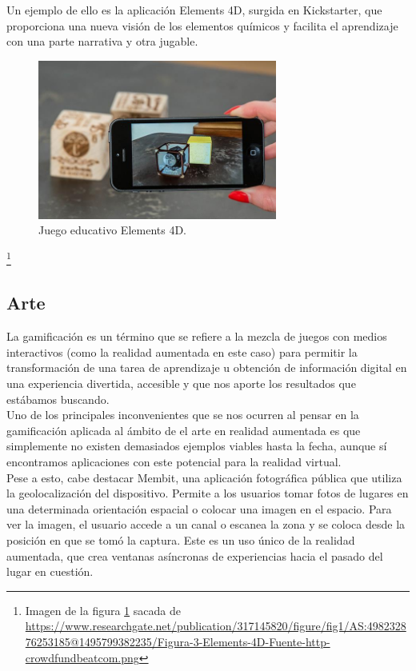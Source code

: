 Un ejemplo de ello es la aplicación Elements 4D, surgida en Kickstarter, que proporciona una nueva visión de los elementos químicos y facilita el aprendizaje con una parte narrativa y otra jugable.

\begin{figure}[H]
     \centering
     \includegraphics[width=0.7\textwidth]{Images/Figura-3-Elements-4D.png}
     \caption{Juego educativo Elements 4D.}
     \label{fig:Elemets}
 \end{figure}
 {\let\thefootnote\relax\footnote{{Imagen de la figura \ref{fig:Elemets} sacada de \url{https://www.researchgate.net/publication/317145820/figure/fig1/AS:498232876253185@1495799382235/Figura-3-Elements-4D-Fuente-http-crowdfundbeatcom.png}}}}

\subsection{Arte}
La gamificación es un término que se refiere a la mezcla de juegos con medios interactivos (como la realidad aumentada en este caso) para permitir la transformación de una tarea de aprendizaje u obtención de información digital en una experiencia divertida, accesible y que nos aporte los resultados que estábamos buscando.\\

Uno de los principales inconvenientes que se nos ocurren al pensar en la gamificación aplicada al ámbito de el arte en realidad aumentada es que simplemente no existen demasiados ejemplos viables hasta la fecha, aunque sí encontramos aplicaciones con este potencial para la realidad virtual.\\

Pese a esto, cabe destacar Membit\cite{MembitYT}, una aplicación fotográfica pública que utiliza la geolocalización del dispositivo. Permite a los usuarios tomar fotos de lugares en una determinada orientación espacial o colocar una imagen en el espacio. Para ver la imagen, el usuario accede a un canal o escanea la zona y se coloca desde la posición en que se tomó la captura. Este es un uso único de la realidad aumentada, que crea ventanas asíncronas de experiencias hacia el pasado del lugar en cuestión.\cite{ARGames_Gamification}

